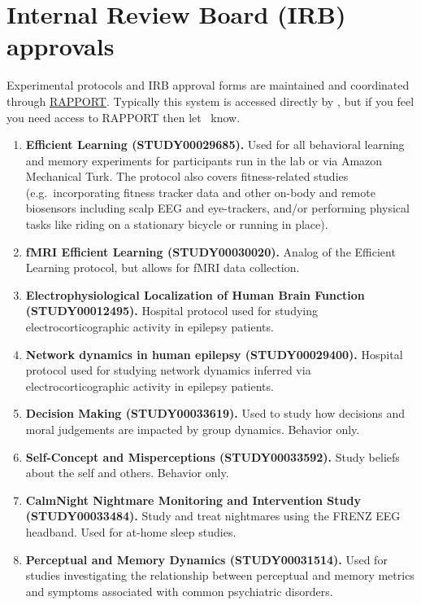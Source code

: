 \documentclass{tufte-book} %
\begin{document}
\chapter{Internal Review Board (IRB) approvals}\label{ch:irb}
Experimental  protocols and IRB approval forms are maintained and
coordinated through \href{https://rapport.dartmouth.edu/}{RAPPORT}.
Typically this system is accessed directly by \director, but if you
feel you need access to RAPPORT then let \director~know.


 \begin{enumerate}
 \item \textbf{Efficient Learning (STUDY00029685).}  Used for all
   behavioral learning and memory experiments for participants run in
   the lab or via Amazon Mechanical Turk.  The protocol also covers
   fitness-related studies (e.g.\ incorporating fitness tracker data
   and other on-body and remote biosensors including scalp EEG and
   eye-trackers, and/or performing physical tasks like riding on a
   stationary bicycle or running in place).
    \item \textbf{fMRI Efficient Learning (STUDY00030020).}  Analog of
      the Efficient Learning protocol, but allows for fMRI data
      collection.
    \item \textbf{Electrophysiological Localization of Human Brain
        Function (STUDY00012495).}  Hospital protocol used for
      studying electrocorticographic activity in epilepsy patients.
    \item \textbf{Network dynamics in human epilepsy (STUDY00029400).}
      Hospital protocol used for studying network dynamics inferred
      via electrocorticographic activity in epilepsy patients.
    \item \textbf{Decision Making (STUDY00033619).}  Used to study
      how decisions and moral judgements are impacted by group
      dynamics.  Behavior only.
    \item \textbf{Self-Concept and Misperceptions (STUDY00033592).}
      Study beliefs about the self and others.  Behavior only.
    \item \textbf{CalmNight Nightmare Monitoring and Intervention
        Study (STUDY00033484).}  Study and treat nightmares using the
      FRENZ EEG headband.  Used for at-home sleep studies.
    \item \textbf{Perceptual and Memory Dynamics (STUDY00031514).}
      Used for studies investigating the relationship between
      perceptual and memory metrics and symptoms associated with
      common psychiatric disorders.

   \end{enumerate}
\end{document}

